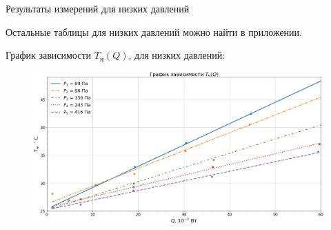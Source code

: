 \documentclass[a4paper,12pt]{article}
\theoremstyle{definition}
\begin{document}
\begin{enumerate}
\begin{table}[H]
		\caption{Результаты измерений для низких давлений}
		\label{lowp}
	\end{table}
	Остальные таблицы для низких давлений можно найти в приложении.
	
	График зависимости $T_{н}(Q)$, для низких давлений:
	\begin{figure}[!h]
		\centering
		\includegraphics[scale = 0.55]{tq1}
		\label{graph2}
	\end{figure}
	

\end{enumerate}
\end{document}
